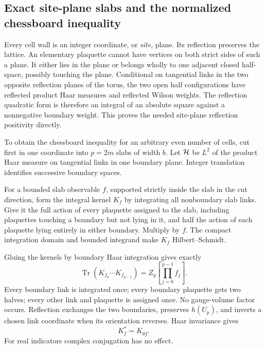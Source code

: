 \documentclass[11pt]{article}
\theoremstyle{remark}
\begin{document}
\subsection{Exact site-plane slabs and the normalized chessboard inequality}
\label{fwp-slab-section}

Every cell wall is an integer coordinate, or \emph{site}, plane.
Its reflection preserves the lattice. An elementary plaquette cannot
have vertices on both strict sides of such a plane. It either lies in
the plane or belongs wholly to one adjacent closed half-space, possibly
touching the plane. Conditional on tangential links in the two opposite
reflection planes of the torus, the two open half configurations have
reflected product Haar measures and reflected Wilson weights.
The reflection quadratic form is therefore an integral of an absolute
square against a nonnegative boundary weight. This proves the needed
site-plane reflection positivity directly.

To obtain the chessboard inequality for an arbitrary even number of
cells, cut first in one coordinate into \(p=2m\) slabs of width \(b\).
Let \({\cal H}\) be \(L^2\) of the product Haar measure on tangential
links in one boundary plane. Integer translation identifies successive
boundary spaces.

For a bounded slab observable \(f\), supported strictly inside the
slab in the cut direction, form the integral kernel \(K_f\) by integrating
all nonboundary slab links. Give it the full action of every plaquette
assigned to the slab, including plaquettes touching a boundary but not
lying in it, and half the action of each plaquette lying entirely in
either boundary. Multiply by \(f\).
The compact integration domain and bounded integrand make \(K_f\)
Hilbert--Schmidt.

Gluing the kernels by boundary Haar integration gives exactly
\begin{equation}
 \operatorname{Tr}(K_{f_0}\cdots K_{f_{p-1}})
       =Z_g\!\left[\prod_{j=0}^{p-1}f_j\right].
 \label{fwp-gluing}
\end{equation}
Every boundary link is integrated once; every boundary plaquette gets
two halves; every other link and plaquette is assigned once.
No gauge-volume factor occurs. Reflection exchanges the two boundaries,
preserves \(h(U_p)\), and inverts a chosen link coordinate when its
orientation reverses. Haar invariance gives
\begin{equation}
 K_f^*=K_{\theta\overline f}.
 \label{fwp-adjoint}
\end{equation}
For real indicators complex conjugation has no effect.
\end{document}
